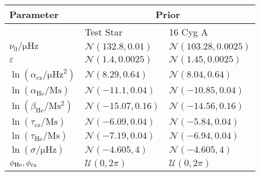 \begin{tabular}{lll}
\toprule
Parameter & \multicolumn{2}{c}{Prior} \\
\midrule
 & Test Star & 16 Cyg A \\
\midrule
$\nu_0/\si{\micro\hertz}$ & $\mathcal{N}(132.8,0.01)$ & $\mathcal{N}(103.28,0.0025)$ \\ 
$\varepsilon$ & $\mathcal{N}(1.4,0.0025)$ & $\mathcal{N}(1.45,0.0025)$ \\ 
$\ln(\alpha_\mathrm{cz}/\si{\micro\hertz\squared})$ & $\mathcal{N}(8.29,0.64)$ & $\mathcal{N}(8.04,0.64)$ \\ 
$\ln(\alpha_\mathrm{He}/\si{\mega\second})$ & $\mathcal{N}(-11.1,0.04)$ & $\mathcal{N}(-10.85,0.04)$ \\
$\ln(\beta_\mathrm{He}/\si{\mega\second\squared})$ & $\mathcal{N}(-15.07,0.16)$ & $\mathcal{N}(-14.56,0.16)$ \\
$\ln(\tau_\mathrm{cz}/\si{\mega\second})$ & $\mathcal{N}(-6.09,0.04)$ & $\mathcal{N}(-5.84,0.04)$ \\
$\ln(\tau_\mathrm{He}/\si{\mega\second})$ & $\mathcal{N}(-7.19,0.04)$ & $\mathcal{N}(-6.94,0.04)$ \\
$\ln(\sigma/\si{\micro\hertz})$ & $\mathcal{N}(- 4.605, 4)$ & $\mathcal{N}(- 4.605, 4)$ \\
$\phi_{{\mathrm{He}}}, \phi_{{\mathrm{cz}}}$ & $\mathcal{U}(0, 2\pi)$ & $\mathcal{U}(0, 2\pi)$ \\
\bottomrule
\end{tabular}

